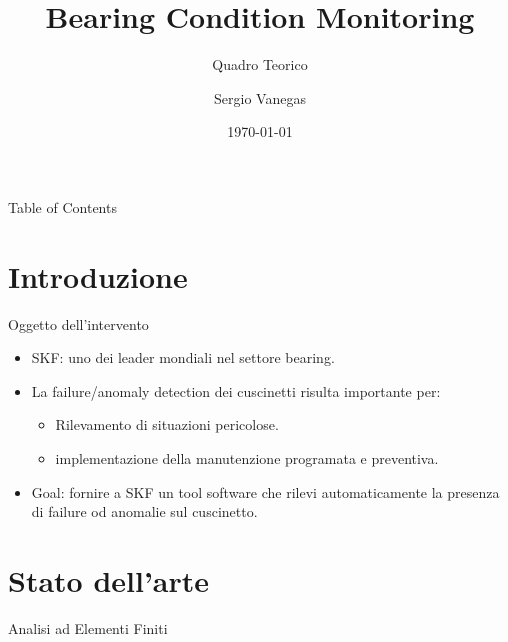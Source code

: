 \documentclass{beamer}
\title{Bearing Condition Monitoring}
\subtitle{Quadro Teorico}
\author{Sergio Vanegas}
\institute{Modelway S.r.l.}
\date{\today}
\begin{document}
\frame{\titlepage}

\begin{frame}{Table of Contents}
    \tableofcontents
\end{frame}

\section{Introduzione}

\begin{frame}{Oggetto dell'intervento}
    \begin{itemize}
        \item SKF: uno dei leader mondiali nel settore bearing.
        \item La failure/anomaly detection dei cuscinetti risulta importante per:
        \begin{itemize}
            \item Rilevamento di situazioni pericolose.
            \item implementazione della manutenzione programata e preventiva.
        \end{itemize}
        \item Goal: fornire a SKF un tool software che rilevi automaticamente la presenza di failure od anomalie sul cuscinetto.
    \end{itemize}
\end{frame}

\section{Stato dell'arte}

\begin{frame}{Analisi ad Elementi Finiti}
    
\end{frame}
\end{document}
